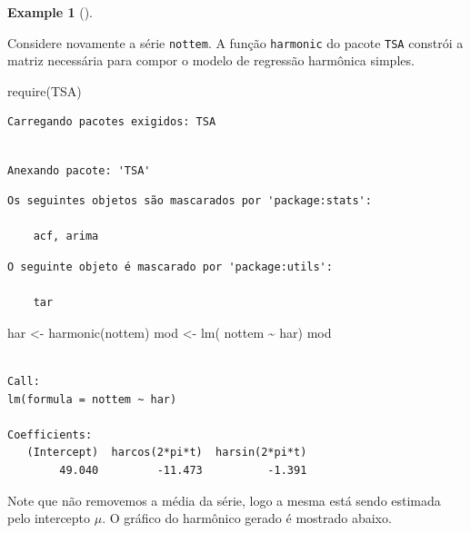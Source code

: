 \documentclass[
  letterpaper,
  DIV=11,
  numbers=noendperiod]{scrartcl}
\newenvironment{Shaded}{\begin{snugshade}}{\end{snugshade}}
\newcommand{\FunctionTok}[1]{\textcolor[rgb]{0.28,0.35,0.67}{#1}}
\newcommand{\NormalTok}[1]{\textcolor[rgb]{0.00,0.23,0.31}{#1}}
\newcommand{\OtherTok}[1]{\textcolor[rgb]{0.00,0.23,0.31}{#1}}
\newcommand{\SpecialCharTok}[1]{\textcolor[rgb]{0.37,0.37,0.37}{#1}}
\theoremstyle{definition}
\newtheorem{example}{Example}[chapter]
\theoremstyle{definition}
\theoremstyle{plain}
\theoremstyle{plain}
\theoremstyle{remark}
\begin{document}
\begin{example}[]\protect\hypertarget{exm-nottemHarmonico1}{}\label{exm-nottemHarmonico1}

Considere novamente a série \texttt{nottem}. A função \texttt{harmonic}
do pacote \texttt{TSA} constrói a matriz necessária para compor o modelo
de regressão harmônica simples.

\begin{Shaded}
\begin{Highlighting}[]
\FunctionTok{require}\NormalTok{(TSA)}
\end{Highlighting}
\end{Shaded}

\begin{verbatim}
Carregando pacotes exigidos: TSA
\end{verbatim}

\begin{verbatim}

Anexando pacote: 'TSA'
\end{verbatim}

\begin{verbatim}
Os seguintes objetos são mascarados por 'package:stats':

    acf, arima
\end{verbatim}

\begin{verbatim}
O seguinte objeto é mascarado por 'package:utils':

    tar
\end{verbatim}

\begin{Shaded}
\begin{Highlighting}[]
\NormalTok{har }\OtherTok{\textless{}{-}} \FunctionTok{harmonic}\NormalTok{(nottem)}
\NormalTok{mod }\OtherTok{\textless{}{-}} \FunctionTok{lm}\NormalTok{( nottem }\SpecialCharTok{\textasciitilde{}}\NormalTok{ har)}
\NormalTok{mod}
\end{Highlighting}
\end{Shaded}

\begin{verbatim}

Call:
lm(formula = nottem ~ har)

Coefficients:
   (Intercept)  harcos(2*pi*t)  harsin(2*pi*t)  
        49.040         -11.473          -1.391  
\end{verbatim}

Note que não removemos a média da série, logo a mesma está sendo
estimada pelo intercepto \(\mu\). O gráfico do harmônico gerado é
mostrado abaixo.


\end{example}
\end{document}
